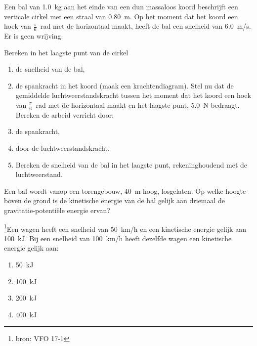\documentclass{ximera}
\begin{document}
\begin{exercise}
Een bal van \SI{1,0}{kg} aan het einde van een dun massaloos koord beschrijft een verticale cirkel met een straal van \SI{0,80}{m}. Op het moment dat het koord een hoek van $\frac{\pi}{6}$\SI{}{\radian} met de horizontaal maakt, heeft de bal een snelheid van \SI{6,0}{m/s}. Er is geen wrijving.

Bereken in het laagste punt van de cirkel
\begin{enumerate}
	\item de snelheid van de bal,
	\item de spankracht in het koord (maak een krachtendiagram).
	\newline
	\newline
	Stel nu dat de gemiddelde luchtweerstandskracht tussen het moment dat het koord een hoek van $\frac{\pi}{6}$\SI{}{\radian} met de horizontaal maakt en het laagste punt, \SI{5,0}{N} bedraagt. Bereken de arbeid verricht door:
	\item de spankracht,
	\item door de luchtweerstandskracht.
	\item Bereken de snelheid van de bal in het laagste punt, rekeninghoudend met de luchtweerstand.
\end{enumerate}
\end{exercise}

\begin{exercise}
	Een bal wordt vanop een torengebouw, \SI{40}{m} hoog, losgelaten. Op welke hoogte boven de grond is de kinetische energie van de bal gelijk aan driemaal de gravitatie-potentiële energie ervan?
\end{exercise}

\begin{exercise}
\footnote{bron: VFO 17-1}Een wagen heeft een snelheid van \SI{50}{km/h} en een kinetische energie gelijk aan \SI{100}{kJ}. Bij een snelheid van \SI{100}{km/h} heeft dezelfde wagen een kinetische energie gelijk aan:
\begin{enumerate}
	\item \SI{50}{kJ}
	\item \SI{100}{kJ}
	\item \SI{200}{kJ}
	\item \SI{400}{kJ}
\end{enumerate}
\end{exercise}
\end{document}
